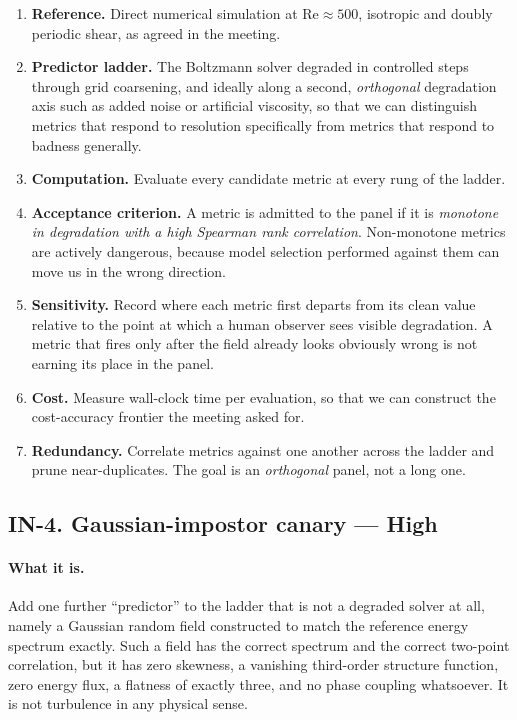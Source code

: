 \documentclass[11pt]{article}
\newcommand{\High}{\textbf{High}}
\begin{document}
\begin{enumerate}[leftmargin=*]
\item \textbf{Reference.} Direct numerical simulation at $\mathrm{Re} \approx 500$, isotropic
and doubly periodic shear, as agreed in the meeting.
\item \textbf{Predictor ladder.} The Boltzmann solver degraded in controlled steps through
grid coarsening, and ideally along a second, \emph{orthogonal} degradation axis such as added
noise or artificial viscosity, so that we can distinguish metrics that respond to resolution
specifically from metrics that respond to badness generally.
\item \textbf{Computation.} Evaluate every candidate metric at every rung of the ladder.
\item \textbf{Acceptance criterion.} A metric is admitted to the panel if it is
\emph{monotone in degradation with a high Spearman rank correlation}. Non-monotone metrics
are actively dangerous, because model selection performed against them can move us in the
wrong direction.
\item \textbf{Sensitivity.} Record where each metric first departs from its clean value
relative to the point at which a human observer sees visible degradation. A metric that fires
only after the field already looks obviously wrong is not earning its place in the panel.
\item \textbf{Cost.} Measure wall-clock time per evaluation, so that we can construct the
cost-accuracy frontier the meeting asked for.
\item \textbf{Redundancy.} Correlate metrics against one another across the ladder and prune
near-duplicates. The goal is an \emph{orthogonal} panel, not a long one.
\end{enumerate}

\subsection{IN-4. Gaussian-impostor canary --- \High{}}

\paragraph{What it is.} Add one further ``predictor'' to the ladder that is not a degraded
solver at all, namely a Gaussian random field constructed to match the reference energy
spectrum exactly. Such a field has the correct spectrum and the correct two-point
correlation, but it has zero skewness, a vanishing third-order structure function, zero
energy flux, a flatness of exactly three, and no phase coupling whatsoever. It is not
turbulence in any physical sense.
\end{document}
